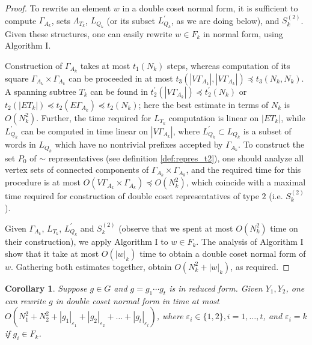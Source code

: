 \documentclass[a4paper,12pt]{article}
\newcommand{\G}{\Gamma }
\newcommand{\e}{\varepsilon }
\renewcommand{\L}{\Lambda }
\newtheorem{corollary}[theorem]{Corollary}
\numberwithin{equation}{section}
\numberwithin{figure}{section}
\begin{document}

\begin{proof}
To rewrite an element $w$ in a double coset normal form, it is
sufficient to compute $\G_{A_k}$, sets $\L_{T_k}$, $L_{Q_k}$ (or
its subset $L^{\prime}_{Q_k}$, as we are doing below), and
$S^{(2)}_k$. Given these structures, one can easily rewrite $w \in
F_k$ in normal form, using Algorithm I.

Construction of $\G_{A_k}$ takes at most $t_1(N_k)$ steps, whereas
computation of its square
 $\G_{A_k} \times \G_{A_k}$ can be proceeded in at most
 $t_3(|V\G_{A_k}|,|V\G_{A_k}|) \preceq t_3(N_k,N_k)$.
A spanning subtree $T_k$ can be found in
$t^{\prime}_2(|V\G_{A_k}|) \preceq t^{\prime}_2(N_k)$ or $t_2(|E
T_k|) \preceq t_2(E\G_{A_k}) \preceq t_2(N_k)$; here the best
estimate in terms of $N_k$ is $O(N_k^2)$. Further, the time
required for $L_{T_k}$ computation is linear on $|E T_k|$, while
$L^{\prime}_{Q_k}$ can be computed in time linear on
$|V\G_{A_k}|$, where $L^{\prime}_{Q_k} \subset L_{Q_k}$ is a
subset of words in $L_{Q_k}$ which have no nontrivial prefixes
accepted by $\G_{A_k}$. To construct the set $P_0$ of $\sim$
representatives (see definition \ref{def:repres_t2}), one should
analyze all vertex sets of connected components of $\G_{A_k}
\times \G_{A_k}$, and the required time for this procedure is at
most $O(V \G_{A_k} \times \G_{A_k}) \preceq O(N^2_k)$, which
coincide with a maximal time required for construction of double
coset representatives of type $2$ (i.e. $S^{(2)}_k$).

Given $\G_{A_k}$, $L_{T_k}$, $L^{\prime}_{Q_k}$ and $S^{(2)}_k$
(observe that we spent at most $O(N^2_k)$ time on their
construction), we apply Algorithm I to $w \in F_k$. The analysis
of Algorithm I show that it take at most $O(|w|_k)$ time to obtain
a double coset normal form of $w$. Gathering both estimates
together, obtain $O(N^2_k + |w|_k)$, as required.
\end{proof}

\begin{corollary}\label{cor:dcnf_time} Suppose $g \in G$ and $g=g_1 \cdots g_t$ is in reduced
form. Given $Y_1, Y_2$, one can rewrite $g$ in double coset normal
form in time at most $O(N^2_1+ N^2_2 + |g_1|_{\e_1}+|g_2|_{\e_2}+
\ldots +|g_t|_{\e_t})$, where $\e_i \in \{ 1, 2\}, i = 1, \ldots,
t$, and $\e_i = k$ if $g_i \in F_k$.
\end{corollary}
\end{document}
